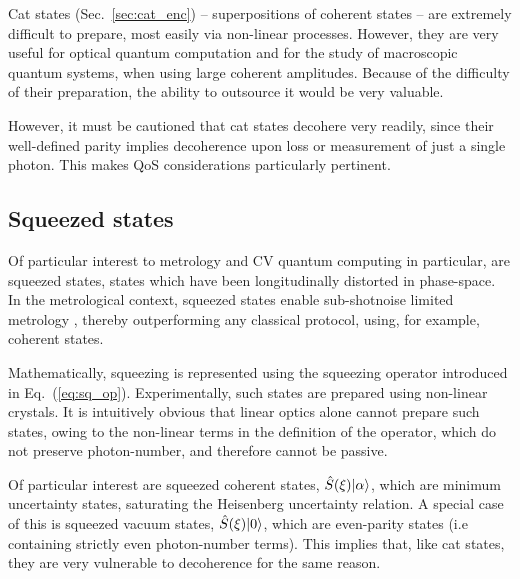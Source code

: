 Cat states (Sec.~\ref{sec:cat_enc}) -- superpositions of coherent states -- are extremely difficult to prepare, most easily via non-linear processes. However, they are very useful for optical quantum computation and for the study of macroscopic quantum systems, when using large coherent amplitudes. Because of the difficulty of their preparation, the ability to outsource it would be very valuable.

However, it must be cautioned that cat states decohere very readily, since their well-defined parity implies decoherence upon loss or measurement of just a single photon. This makes QoS considerations particularly pertinent.

%
%

\subsection{Squeezed states} \label{sec:squeezed_prep} 

Of particular interest to metrology and CV quantum computing in particular, are squeezed states, states which have been longitudinally distorted in phase-space. In the metrological context, squeezed states enable sub-shotnoise limited metrology \cite{???}, thereby outperforming any classical protocol, using, for example, coherent states.

Mathematically, squeezing is represented using the squeezing operator introduced in Eq.~(\ref{eq:sq_op}). Experimentally, such states are prepared using non-linear crystals. It is intuitively obvious that linear optics alone cannot prepare such states, owing to the non-linear terms in the definition of the operator, which do not preserve photon-number, and therefore cannot be passive.

Of particular interest are squeezed coherent states, $\hat{S}(\xi) |\alpha\rangle$, which are minimum uncertainty states, saturating the Heisenberg uncertainty relation. A special case of this is squeezed vacuum states, $\hat{S}(\xi) |0\rangle$, which are even-parity states (i.e containing strictly even photon-number terms). This implies that, like cat states, they are very vulnerable to decoherence for the same reason.

%
%



